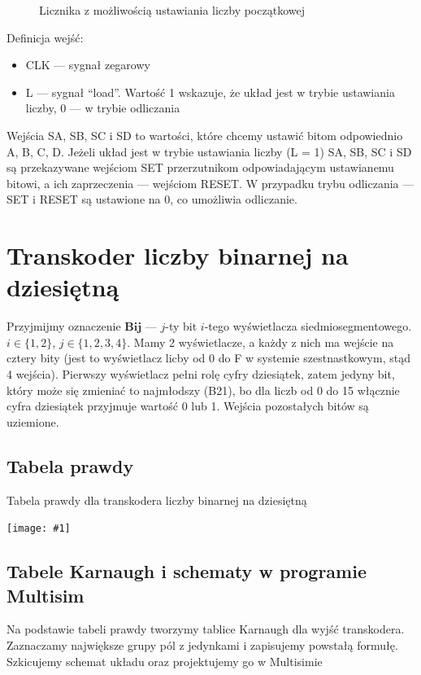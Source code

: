 \documentclass{article}
\newcommand{\tableimg}[3]{
    \begin{table}[H]
        \centering
        \captionsetup{font=small, skip=2pt}
        \caption{#2}
        \texttt{[image: \#1]}
    \end{table}
}
\newcommand{\doubleimage}[7]{
    \begin{figure}[H]
        \centering
        \captionsetup{font=small, skip=2pt}
        \subfloat[#4]{\texttt{[image: \#1]}}
        \hspace{1cm}
        \subfloat[#5]{\texttt{[image: \#2]}}
        \caption{#3}
    \end{figure}
}
\begin{document}
    \doubleimage{images/ustaw_liczbe}{images/ustaw_liczbe_box}{Licznika z możliwością ustawiania liczby początkowej}
    {Schemat układu}{Podukład}{scale=0.5}{scale=0.5}

    Definicja wejść:
    \begin{itemize}
        \item CLK --- sygnał zegarowy
        \item L --- sygnał ``load''. Wartość 1 wskazuje, że układ jest w trybie ustawiania liczby, 0 --- w trybie odliczania
    \end{itemize}
    
    Wejścia SA, SB, SC i SD to wartości, które chcemy ustawić bitom odpowiednio A, B, C, D.
    Jeżeli układ jest w trybie ustawiania liczby (L = 1) SA, SB, SC i SD są przekazywane wejściom SET
    przerzutnikom odpowiadającym ustawianemu bitowi, a ich zaprzeczenia --- wejściom RESET. W przypadku trybu
    odliczania --- SET i RESET są ustawione na 0, co umożliwia odliczanie.
    
    \section{Transkoder liczby binarnej na dziesiętną}
    Przyjmijmy oznaczenie \(\mathbf{Bij}\) --- \(j\)-ty bit \(i\)-tego wyświetlacza siedmiosegmentowego.
    \(i\in\{1, 2\}\), \(j\in\{1, 2, 3, 4\}\). Mamy 2 wyświetlacze, a każdy z nich ma wejście na cztery bity (jest to wyświetlacz licby od 0 do F
    w systemie szestnastkowym, stąd 4 wejścia). Pierwszy wyświetlacz pełni rolę cyfry dziesiątek, zatem jedyny bit,
    który może się zmieniać to najmłodszy (B21), bo dla liczb od 0 do 15 włącznie cyfra dziesiątek przyjmuje wartość 0 lub 1.
    Wejścia pozostałych bitów są uziemione. \\
    
    \subsection{Tabela prawdy}

    \tableimg{images/hex_to_dec_truth}{Tabela prawdy dla transkodera liczby binarnej na dziesiętną}{}

    \subsection{Tabele Karnaugh i schematy w programie Multisim}
    Na podstawie tabeli prawdy tworzymy tablice Karnaugh dla wyjść transkodera. Zaznaczamy największe grupy pól z jedynkami
    i zapisujemy powstałą formułę. Szkicujemy schemat układu oraz projektujemy go w Multisimie
\end{document}
